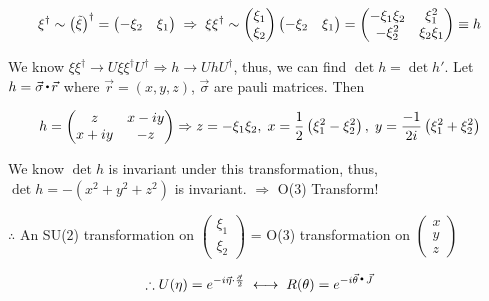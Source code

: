 \documentclass[11pt,letterpaper]{article}
\begin{document}
\begin{align}
 \xi^{\dagger} \sim \left( \tilde{\xi} \right)^\dagger =
 \begin{pmatrix}
  -\xi_2 & \xi_1
 \end{pmatrix}
 \hspace{0.1cm} \Rightarrow \hspace{0.1cm} \xi \xi^{\dagger} \sim
 \begin{pmatrix}
  \xi_1 \\
  \xi_2
 \end{pmatrix}
 \begin{pmatrix}
  -\xi_2 & \xi_1
 \end{pmatrix}
 =
 \begin{pmatrix}
  -\xi_1 \xi_2 & \xi_1^2 \\
  -\xi_2^2 & \xi_2 \xi_1
 \end{pmatrix}
 \equiv h
\end{align}

We know $\xi \xi^\dagger \rightarrow U\xi\xi^{\dagger}U^{\dagger}\Rightarrow h \rightarrow UhU^{\dagger}$, thus, we can find $\det{h} = \det{h'}$.
Let $h = \vec{\sigma}\ld\vec{r}$ where $\vec{r} = (x,y,z)$, $\vec{\sigma}$ are pauli matrices. \footnotemark[2] 
Then 

\begin{align}
 h = 
 \begin{pmatrix}
  z & x - iy \\
  x + iy & -z
 \end{pmatrix}
 \Rightarrow z = -\xi_1\xi_2 ,\hspace{0.1cm} x = \frac{1}{2}\left( \xi_1^2 - \xi_2^2 \right) ,\hspace{0.1cm} y = \frac{-1}{2i}\left( \xi_1^2 + \xi_2^2 \right)
\end{align}

We know $\det{h}$ is invariant under this transformation, thus, $\det{h} = -(x^2 + y^2 + z^2)$ is invariant. $\Rightarrow$ O($3$) Transform!

{\centering
$\therefore$ An SU($2$) transformation on $
\begin{pmatrix}
 \xi_1 \\
 \xi_2
\end{pmatrix}$
 = O($3$) transformation on $
\begin{pmatrix}
 x \\
 y \\
 z
\end{pmatrix}$

\begin{equation}
 \therefore U(\eta) = e^{-i\vec{\eta}\cdot\frac{\vec{\sigma}}{2}} \hs \longleftrightarrow \hs R(\theta) = e^{-i\vec{\theta}\ld \vec{J}}
\end{equation}}
\end{document}
